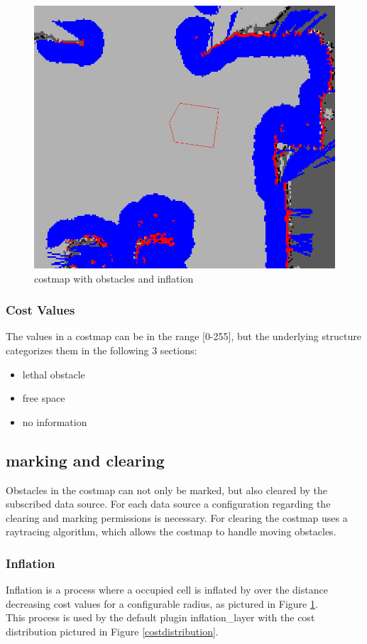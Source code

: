 \begin{figure}[H]
	\includegraphics[width=.5\textwidth]{Pictures/costmap_rviz}
	\caption{costmap with obstacles and inflation \cite{costmap}}
	\label{costmap}
\end{figure}


\subsubsection{Cost Values}
The values in a costmap can be in the range [0-255], but the underlying structure categorizes them in the following 3 sections:
\begin{itemize}
	\item lethal obstacle
	\item free space
	\item no information
\end{itemize}

\subsection{marking and clearing}
Obstacles in the costmap can not only be marked, but also cleared by the subscribed data source. For each data source a configuration regarding the clearing and marking permissions is necessary. For clearing the costmap uses a raytracing algorithm, which allows the costmap to handle moving obstacles\cite{costmap}.
\subsubsection{Inflation}
Inflation is a process where a occupied cell is inflated by over the distance decreasing cost values for a configurable radius, as pictured in Figure \ref{costmap}.\\
This process is used by the default plugin inflation\_layer with the cost distribution pictured in Figure \ref{costdistribution}\cite{costmap}.

